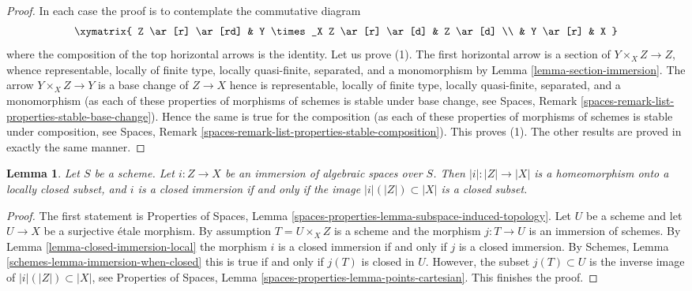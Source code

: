 \documentclass{stacks-project}
\theoremstyle{plain}
\newtheorem{lemma}[subsection]{Lemma}
\theoremstyle{definition}
\theoremstyle{remark}
\numberwithin{equation}{subsection}
\begin{document}
\begin{proof}
In each case the proof is to contemplate the commutative diagram
$$
\xymatrix{
Z \ar[r] \ar[rd] & Y \times_X Z \ar[r] \ar[d] & Z \ar[d] \\
& Y \ar[r] & X
}
$$
where the composition of the top horizontal arrows is the identity.
Let us prove (1). The first horizontal arrow is a section of
$Y \times_X Z \to Z$, whence representable, locally of finite type,
locally quasi-finite, separated, and a monomorphism by
Lemma \ref{lemma-section-immersion}.
The arrow $Y \times_X Z \to Y$ is a base change of $Z \to X$
hence is representable, locally of finite type,
locally quasi-finite, separated, and a monomorphism
(as each of these properties of morphisms of schemes is stable
under base change, see
Spaces, Remark \ref{spaces-remark-list-properties-stable-base-change}).
Hence the same is true for the composition (as each of these properties of
morphisms of schemes is stable under composition, see Spaces, Remark
\ref{spaces-remark-list-properties-stable-composition}).
This proves (1). The other results are proved in exactly the same manner.
\end{proof}

\begin{lemma}
\label{lemma-immersion-when-closed}
Let $S$ be a scheme. Let $i : Z \to X$ be an immersion of algebraic
spaces over $S$. Then $|i| : |Z| \to |X|$ is a homeomorphism onto a
locally closed subset, and $i$ is a closed immersion if and only if
the image $|i|(|Z|) \subset |X|$ is a closed subset.
\end{lemma}

\begin{proof}
The first statement is Properties of Spaces, Lemma
\ref{spaces-properties-lemma-subspace-induced-topology}.
Let $U$ be a scheme and let $U \to X$ be a surjective \'etale morphism.
By assumption $T = U \times_X Z$ is a scheme and the morphism $j : T \to U$
is an immersion of schemes. By Lemma \ref{lemma-closed-immersion-local}
the morphism $i$ is a closed immersion if and only if $j$ is a closed
immersion. By Schemes, Lemma \ref{schemes-lemma-immersion-when-closed}
this is true if and only if $j(T)$ is closed in $U$.
However, the subset $j(T) \subset U$ is the inverse image of
$|i|(|Z|) \subset |X|$, see
Properties of Spaces, Lemma \ref{spaces-properties-lemma-points-cartesian}.
This finishes the proof.
\end{proof}
\end{document}
